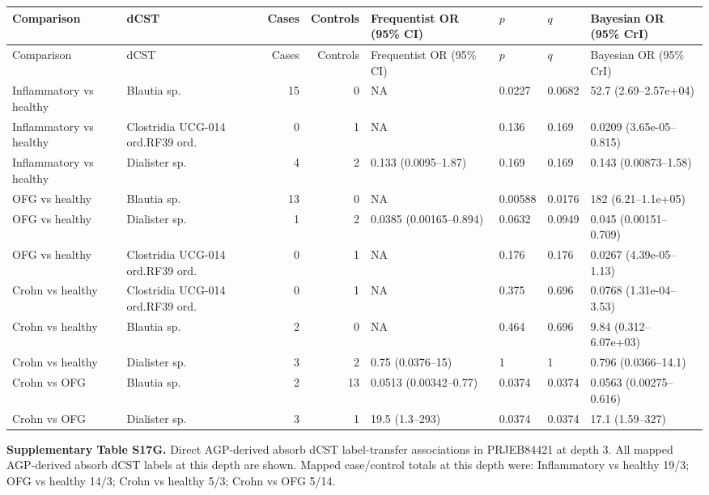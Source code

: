 \begingroup
\scriptsize
\setlength{\tabcolsep}{3pt}
\setlength{\LTleft}{0pt}
\setlength{\LTright}{0pt}
\begin{longtable}{@{} p{} p{} r r p{} p{} p{} p{} @{}}
\toprule
Comparison & dCST & Cases & Controls & Frequentist OR (95\% CI) & \(p\) & \(q\) & Bayesian OR (95\% CrI) \\
\midrule
\endfirsthead
\toprule
Comparison & dCST & Cases & Controls & Frequentist OR (95\% CI) & \(p\) & \(q\) & Bayesian OR (95\% CrI) \\
\midrule
\endhead
\bottomrule
\endfoot
Inflammatory vs healthy & Blautia sp. & 15 & 0 & NA & 0.0227 & 0.0682 & 52.7 (2.69--2.57e+04) \\
Inflammatory vs healthy & Clostridia UCG-014 ord.\dcstsep RF39 ord. & 0 & 1 & NA & 0.136 & 0.169 & 0.0209 (3.65e-05--0.815) \\
Inflammatory vs healthy & Dialister sp. & 4 & 2 & 0.133 (0.0095--1.87) & 0.169 & 0.169 & 0.143 (0.00873--1.58) \\
OFG vs healthy & Blautia sp. & 13 & 0 & NA & 0.00588 & 0.0176 & 182 (6.21--1.1e+05) \\
OFG vs healthy & Dialister sp. & 1 & 2 & 0.0385 (0.00165--0.894) & 0.0632 & 0.0949 & 0.045 (0.00151--0.709) \\
OFG vs healthy & Clostridia UCG-014 ord.\dcstsep RF39 ord. & 0 & 1 & NA & 0.176 & 0.176 & 0.0267 (4.39e-05--1.13) \\
Crohn vs healthy & Clostridia UCG-014 ord.\dcstsep RF39 ord. & 0 & 1 & NA & 0.375 & 0.696 & 0.0768 (1.31e-04--3.53) \\
Crohn vs healthy & Blautia sp. & 2 & 0 & NA & 0.464 & 0.696 & 9.84 (0.312--6.07e+03) \\
Crohn vs healthy & Dialister sp. & 3 & 2 & 0.75 (0.0376--15) & 1 & 1 & 0.796 (0.0366--14.1) \\
Crohn vs OFG & Blautia sp. & 2 & 13 & 0.0513 (0.00342--0.77) & 0.0374 & 0.0374 & 0.0563 (0.00275--0.616) \\
Crohn vs OFG & Dialister sp. & 3 & 1 & 19.5 (1.3--293) & 0.0374 & 0.0374 & 17.1 (1.59--327) \\
\end{longtable}
\endgroup
\bigskip

\noindent\textbf{Supplementary Table S17G.} Direct AGP-derived absorb dCST label-transfer associations in PRJEB84421 at depth 3. All mapped AGP-derived absorb dCST labels at this depth are shown. Mapped case/control totals at this depth were: Inflammatory vs healthy 19/3; OFG vs healthy 14/3; Crohn vs healthy 5/3; Crohn vs OFG 5/14.

